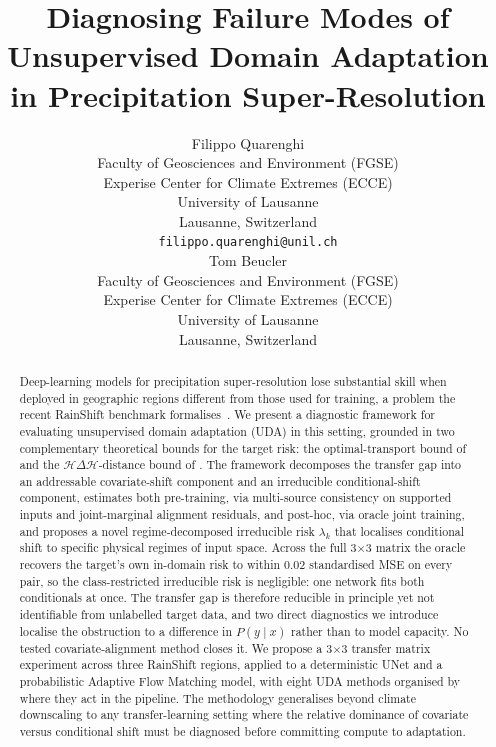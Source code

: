 \documentclass{article}
\title{Diagnosing Failure Modes of Unsupervised Domain Adaptation in Precipitation Super-Resolution}
\author{
    Filippo Quarenghi \\
    Faculty of Geosciences and Environment (FGSE)\\
    Experise Center for Climate Extremes (ECCE)\\
    University of Lausanne \\
    Lausanne, Switzerland \\
    \texttt{filippo.quarenghi@unil.ch} \\
        \And
    Tom Beucler \\
    Faculty of Geosciences and Environment (FGSE)\\
    Experise Center for Climate Extremes (ECCE)\\
    University of Lausanne\\
    Lausanne, Switzerland\\
}
\date{}
\begin{document}
\maketitle

\begin{abstract}
Deep-learning models for precipitation super-resolution lose substantial
skill when deployed in geographic regions different from those used for
training, a problem the recent RainShift benchmark
formalises~\citep{harder2025rainshift}. We present a diagnostic framework
for evaluating unsupervised domain adaptation (UDA) in this setting,
grounded in two complementary theoretical bounds for the target risk:
the optimal-transport bound of \citet{redko2017theoretical} and the
$\mathcal{H}\Delta\mathcal{H}$-distance bound of \citet{bendavid2010theory}.
The framework decomposes the transfer gap into an addressable
covariate-shift component and an irreducible conditional-shift component,
estimates both pre-training, via multi-source consistency on supported
inputs and joint-marginal alignment residuals, and post-hoc, via oracle
joint training, and proposes a novel regime-decomposed irreducible risk
$\lambda_k$ that localises conditional shift to specific physical
regimes of input space. Across the full 3$\times$3 matrix the oracle recovers
the target's own in-domain risk to within $0.02$ standardised MSE on
every pair, so the class-restricted irreducible risk is negligible: one
network fits both conditionals at once. The transfer gap is therefore
reducible in principle yet not identifiable from unlabelled target
data, and two direct diagnostics we introduce localise the obstruction
to a difference in $P(y\mid x)$ rather than to model capacity. No
tested covariate-alignment method closes it. We propose a 3$\times$3 transfer matrix experiment across three
RainShift regions, applied to a deterministic UNet and a probabilistic
Adaptive Flow Matching model, with eight UDA methods organised by where
they act in the pipeline. The methodology generalises beyond climate
downscaling to any transfer-learning setting where the relative
dominance of covariate versus conditional shift must be diagnosed before
committing compute to adaptation.
\end{abstract}


\end{document}
